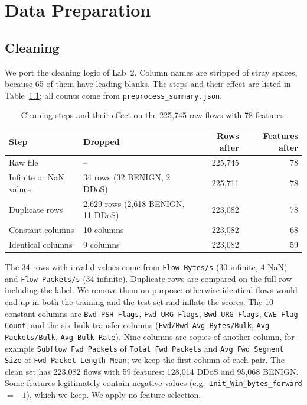 \chapter{Data Preparation}\label{chap:data}

\section{Cleaning}
We port the cleaning logic of Lab~2. Column names are stripped of stray spaces, because 65 of them have leading blanks. The steps and their effect are listed in Table~\ref{tab:cleaning}; all counts come from \texttt{preprocess\_summary.json}.

\begin{table}[htb]
\centering
\caption{Cleaning steps and their effect on the 225,745 raw flows with 78 features.}\label{tab:cleaning}
\begin{tabular}{llrr}
\toprule
Step & Dropped & Rows after & Features after \\
\midrule
Raw file & -- & 225,745 & 78 \\
Infinite or NaN values & 34 rows (32 BENIGN, 2 DDoS) & 225,711 & 78 \\
Duplicate rows & 2,629 rows (2,618 BENIGN, 11 DDoS) & 223,082 & 78 \\
Constant columns & 10 columns & 223,082 & 68 \\
Identical columns & 9 columns & 223,082 & 59 \\
\bottomrule
\end{tabular}
\end{table}

The 34 rows with invalid values come from \texttt{Flow Bytes/s} (30 infinite, 4 NaN) and \texttt{Flow Packets/s} (34 infinite). Duplicate rows are compared on the full row including the label. We remove them on purpose: otherwise identical flows would end up in both the training and the test set and inflate the scores. The 10 constant columns are \texttt{Bwd PSH Flags}, \texttt{Fwd URG Flags}, \texttt{Bwd URG Flags}, \texttt{CWE Flag Count}, and the six bulk-transfer columns (\texttt{Fwd/Bwd Avg Bytes/Bulk}, \texttt{Avg Packets/Bulk}, \texttt{Avg Bulk Rate}). Nine columns are copies of another column, for example \texttt{Subflow Fwd Packets} of \texttt{Total Fwd Packets} and \texttt{Avg Fwd Segment Size} of \texttt{Fwd Packet Length Mean}; we keep the first column of each pair. The clean set has 223,082 flows with 59 features: 128,014 DDoS and 95,068 BENIGN. Some features legitimately contain negative values (e.g.\ \texttt{Init\_Win\_bytes\_forward} $=-1$), which we keep. We apply no feature selection.

